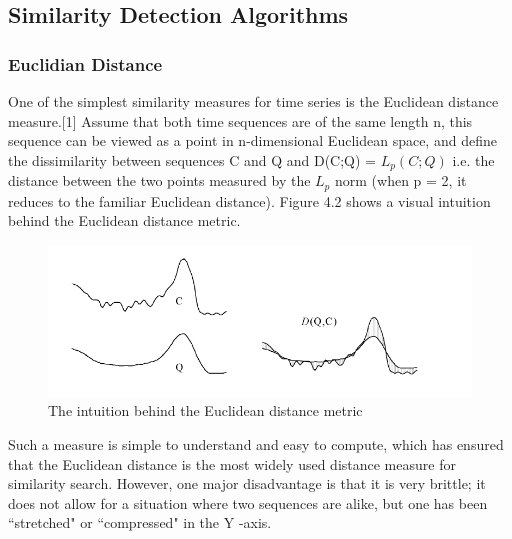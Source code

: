 \documentclass[12pt,a4paper]{report}
\begin{document}
\subsection{Similarity Detection Algorithms}
\subsubsection{Euclidian Distance}
One of the simplest similarity measures for time series is the Euclidean distance
measure.[1] Assume that both time sequences are of the same length n, this sequence can be viewed as a point in n-dimensional Euclidean space, and define
the dissimilarity between sequences C and Q and D(C;Q) = $L_p(C;Q)$
i.e. the distance between the two points measured by the $L_p$ norm (when p = 2, it reduces to the familiar Euclidean distance). Figure 4.2 shows a visual intuition
behind the Euclidean distance metric.

\begin{figure}[h!]
  \centering
    \includegraphics[scale=0.6]{screenshots/euclid.png}
    \caption{The intuition behind the Euclidean distance metric}
\end{figure}
Such a measure is simple to understand and easy to compute, which has ensured that the Euclidean distance is the most widely used distance measure for similarity search. However, one major disadvantage is that it is very brittle; it does not allow
for a situation where two sequences are alike, but one has been ``stretched" or ``compressed" in the Y -axis.
\end{document}
